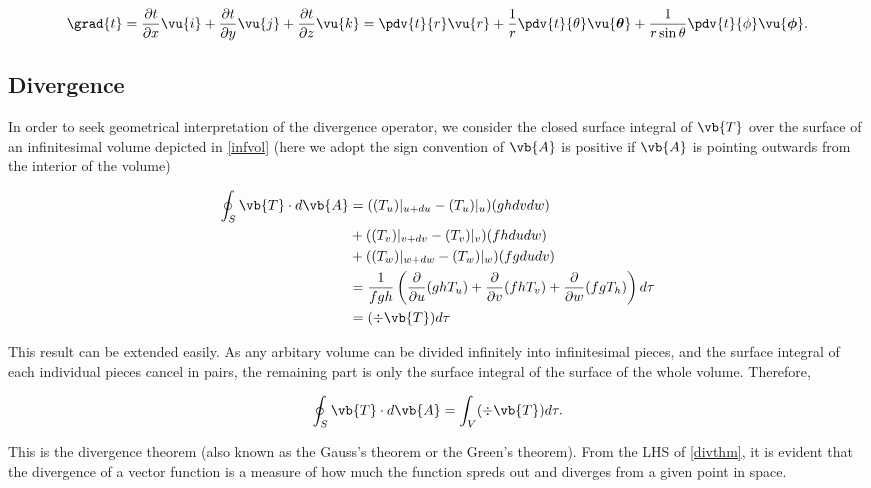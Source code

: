 \documentclass[english,a4paper,12pt]{report}
\begin{document}
\begin{equation} 
	\grad{t} = \frac{\partial t}{\partial x} \vu{i} + \frac{\partial t}{\partial y} \vu{j} + \frac{\partial t}{\partial z} \vu{k} = \pdv{t}{r}\vu{r} + \frac{1}{r}\pdv{t}{\theta}\vu{\boldsymbol{\theta } } + \frac{1}{r\sin{\theta}}\pdv{t}{\phi}\vu{\boldsymbol{\phi } }. 
\end{equation}
	
\subsection{Divergence}

	
In order to seek geometrical interpretation of the divergence operator, we consider the closed surface integral of \(\vb{T}\) over the surface of an infinitesimal volume depicted in \cref{infvol} (here we adopt the sign convention of \(\vb{A}\) is positive if \(\vb{A}\) is pointing outwards from the interior of the volume)

\begin{equation} \label{divpre} 
	\begin{aligned} 
    \oint_{S} \vb{T} \cdot d\vb{A} &= ((T_u)|_{u+du} - (T_u)|_{u})(ghdvdw) \\ &+ ((T_v)|_{v+dv} - (T_v)|_{v})(fhdudw) \\ &+ ((T_w)|_{w+dw} - (T_w)|_{w})(fgdudv) \\
    &= \frac{1}{fgh} \left( 
		\frac{\partial}{\partial u} (ghT_{u} ) + 
		\frac{\partial}{\partial v} (fhT_{v} )+ 
		\frac{\partial}{\partial w} (fgT_{h} ) \right) d\tau \\
	&= (\div{\vb{T}}) d\tau
    \end{aligned} 
\end{equation} 
	
This result can be extended easily. As any arbitary volume can be divided infinitely into infinitesimal pieces, and the surface integral of each individual pieces cancel in pairs, the remaining part is only the surface integral of the surface of the whole volume. Therefore,
	
\begin{equation} 
	\oint_{S} \vb{T} \cdot d\vb{A} = \int_{V}(\div{\vb{T} }) d\tau \label{divthm}. 
\end{equation}
	
This is the divergence theorem (also known as the Gauss's theorem or the Green's theorem). From the LHS of \cref{divthm}, it is evident that the divergence of a vector function is a measure of how much the function spreds out and diverges from a given point in space.
\end{document}
